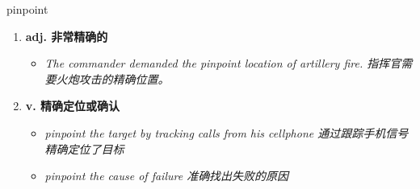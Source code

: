 
\begin{frame}
{\huge pinpoint}
\begin{center}
\begin{enumerate}\Large
  \item \textbf{adj. 非常精确的}
  \begin{itemize}
    \item \em{\Large{The commander demanded the pinpoint location of artillery fire. 指挥官需要火炮攻击的精确位置。}}
  \end{itemize}
  \item \textbf{v. 精确定位或确认}
  \begin{itemize}
    \item \em{\Large{pinpoint the target by tracking calls from his cellphone 通过跟踪手机信号精确定位了目标}}
    \item \em{\Large{pinpoint the cause of failure 准确找出失败的原因}}
  \end{itemize}
\end{enumerate}
\end{center}
\end{frame}
